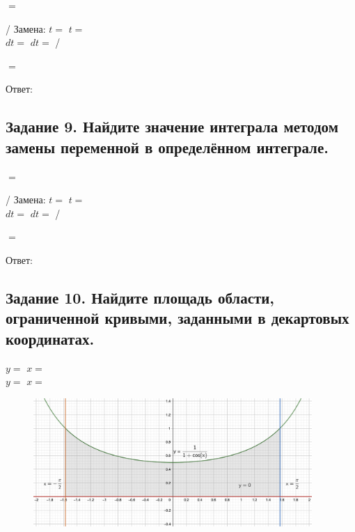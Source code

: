 \documentclass[12pt]{article}
\begin{document}
$=$\vspace{2.5mm}

/ Замена: $t= $  \hspace{2.5mm}  $t=$ \vspace{2.5mm}\\
$dt=$ \hspace{2.5mm} $dt=$ /\vspace{2.5mm}

$=$\vspace{2.5mm}

Ответ: $ $

\subsection*{Задание 9. Найдите значение интеграла методом замены переменной в
определённом интеграле.}

$=$\vspace{2.5mm}

/ Замена: $t= $  \hspace{2.5mm}  $t=$ \vspace{2.5mm}\\
$dt=$ \hspace{2.5mm} $dt=$ /\vspace{2.5mm}


$=$\vspace{2.5mm}

Ответ: $ $

\subsection*{Задание 10. Найдите площадь области, ограниченной кривыми, заданными в
декартовых координатах.}

$y=$\hspace{2.5mm} $x=$ \vspace{2.5mm}\\
$y=$\hspace{2.5mm} $x=$ \vspace{2.5mm}

\begin{figure}[ht!]
\centering
\includegraphics[width=300pt]{Figures/10.png}
\end{figure}
\end{document}
